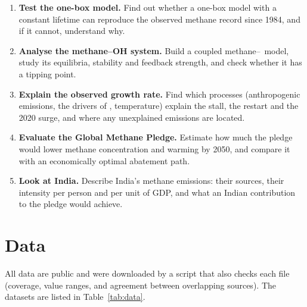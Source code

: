 \documentclass[11pt,a4paper]{article}
\newcommand{\OH}{\ce{OH}}
\begin{document}
\begin{enumerate}\itemsep2pt
\item \textbf{Test the one-box model.} Find out whether a one-box model with a constant lifetime can reproduce the observed methane record since 1984, and if it cannot, understand why.
\item \textbf{Analyse the methane--OH system.} Build a coupled methane--\OH\ model, study its equilibria, stability and feedback strength, and check whether it has a tipping point.
\item \textbf{Explain the observed growth rate.} Find which processes (anthropogenic emissions, the drivers of \OH, temperature) explain the stall, the restart and the 2020 surge, and where any unexplained emissions are located.
\item \textbf{Evaluate the Global Methane Pledge.} Estimate how much the pledge would lower methane concentration and warming by 2050, and compare it with an economically optimal abatement path.
\item \textbf{Look at India.} Describe India's methane emissions: their sources, their intensity per person and per unit of GDP, and what an Indian contribution to the pledge would achieve.
\end{enumerate}

\section{Data}

All data are public and were downloaded by a script that also checks each file (coverage, value ranges, and agreement between overlapping sources). The datasets are listed in Table~\ref{tab:data}.
\end{document}
